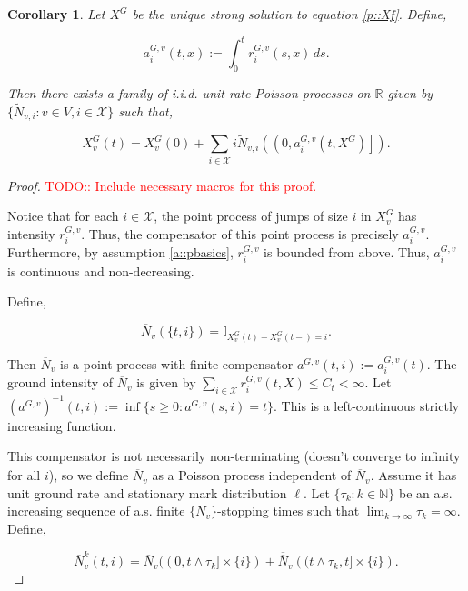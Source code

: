 \documentclass[12pt]{article}
\newcommand{\mb}{\mathbb}
\newcommand{\mc}{\mathcal}
\newcommand{\ra}{\rightarrow}
\newcommand{\ov}{\overline}
\newcommand{\tr}{\textcolor{red}}
\newcommand{\ind}{\hspace{24pt}}
\newcommand{\defeq}{:=}								%
\newcommand{\sta}{\mc{X}}							%
\newcommand{\Xf}{X}									%
\newcommand{\poiss}{N}								%
\newcommand{\Sm}{\ell}								%
\newcommand{\rate}{r}								%
\newcommand{\xf}{x}									%
\newcommand{\poissv}[1]{_{#1}}						%
\newcommand{\vind}[1]{_{#1}}						%
\newcommand{\tme}[1]{(#1)}							%
\newcommand{\gind}[1]{^{#1}}						%
\newcommand{\stpara}[1]{_{#1}}						%
\newcommand{\gvpara}[2]{^{#1,#2}}					%
\newcommand{\jumpbd}[1]{C_{#1}}						%
\newcommand{\tmepro}[2]{(#1,#2)}					%
\newcommand{\compen}{a}								%
\newcommand{\poissvst}[2]{_{#1,#2}}					%
\newcommand{\binver}[1]{(#1)^{-1}}					%
\newcommand{\alt}[1]{\tilde{#1}}					%
\newcommand{\rt}{\tau}								%
\newtheorem{coro}[thms]{Corollary}
\begin{document}
\begin{coro}
Let \(\Xf\gind{G}\) be the unique strong solution to equation \eqref{p::Xf}. Define,

\[\compen\gvpara{G}{v}\stpara{i}\tmepro{t}{\xf} \defeq \int_0^t \rate\gvpara{G}{v}\stpara{i}\tmepro{s}{\xf}\,ds.\]

Then there exists a family of i.i.d. unit rate Poisson processes on \(\mb{R}\) given by \(\{\alt{\poiss}\poissvst{v}{i}:v \in V,i \in \sta\}\) such that,

\[\Xf\gind{G}\vind{v}\tme{t} = \Xf\gind{G}\vind{v}\tme{0} + \sum_{i \in \sta} i\alt{\poiss}\poissvst{v}{i}\left(\left(0,a\gvpara{G}{v}\stpara{i}\tmepro{t}{\Xf\gind{G}}\right]\right).\]
\end{coro}
\begin{proof}
\tr{TODO:: Include necessary macros for this proof.}

Notice that for each \(i\in \sta\), the point process of jumps of size \(i\) in \(\Xf\gind{G}\vind{v}\) has intensity \(\rate\gvpara{G}{v}\stpara{i}\). Thus, the compensator of this point process is precisely \(\compen\gvpara{G}{v}\stpara{i}\). Furthermore, by assumption \ref{a::pbasics}, \(\rate\gvpara{G}{v}\stpara{i}\) is bounded from above. Thus, \(\compen\gvpara{G}{v}\stpara{i}\) is continuous and non-decreasing.

Define,

\[\ov{\poiss}\poissv{v}(\{t,i\}) = \mb{I}_{\Xf\gind{G}\vind{v}\tme{t} - \Xf\gind{G}\vind{v}\tme{t-} = i}.\]

Then \(\ov{\poiss}\poissv{v}\) is a point process with finite compensator \(\compen\gvpara{G}{v}(t,i) \defeq \compen\gvpara{G}{v}\stpara{i}\tme{t}\). The ground intensity of \(\ov{\poiss}\poissv{v}\) is given by \(\sum_{i\in \sta}\rate\gvpara{G}{v}\stpara{i}\tmepro{t}{\Xf} \leq \jumpbd{t} < \infty\). Let \(\binver{\compen\gvpara{G}{v}}(t,i) \defeq \inf\{s \geq 0: \compen\gvpara{G}{v}(s,i) = t\}\). This is a left-continuous strictly increasing function.

\ind This compensator is not necessarily non-terminating (doesn't converge to infinity for all \(i\)), so we define \(\ov{\ov{\poiss}}\poissv{v}\) as a Poisson process independent of \(\ov{\poiss}\poissv{v}\). Assume it has unit ground rate and stationary mark distribution \(\Sm\). Let \(\{\tau_k:k\in\mb{N}\}\) be an a.s. increasing sequence of a.s. finite \(\{\poiss\poissv{v}\}\)-stopping times such that \(\lim_{k \ra \infty} \rt_k = \infty\). Define,

\[\ov{\poiss}\poissv{v}^k(t,i) = \ov{\poiss}\poissv{v}((0,t\wedge\tau_k]\times\{i\}) + \ov{\ov{\poiss}}\poissv{v}\left((t\wedge\tau_k,t]\times\{i\}\right).\]


\end{proof}
\end{document}
